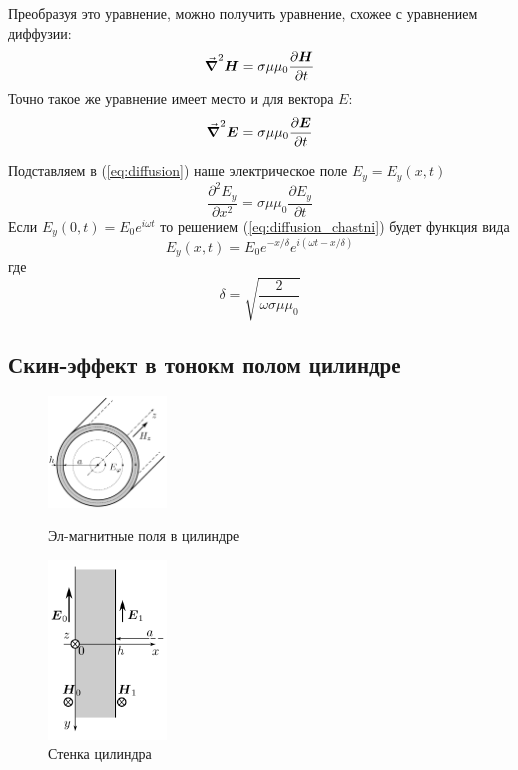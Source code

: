 \documentclass[a4paper, 12pt]{article}
\begin{document}
	Преобразуя это уравнение, можно получить уравнение, схожее с уравнением диффузии:
	\begin{equation}
		\grad^2\vb*{H}=\sigma\mu\mu_0 \frac{\partial \vb*{H}}{\partial t}\label{eq:laplacian_H}
	\end{equation}
	Точно такое же уравнение имеет место и для вектора $E:$
	\begin{equation}
		\grad^2\vb*{E}=\sigma\mu\mu_0 \frac{\partial \vb*{E}}{\partial t}\label{eq:diffusion}
	\end{equation}
	
	Подставляем в (\ref{eq:diffusion}) наше электрическое поле $E_y=E_y(x,t)$
	\begin{equation}
		\frac{\partial^2 E_y}{\partial x^2} = \sigma\mu\mu_0\frac{\partial E_y}{\partial t}
		\label{eq:diffusion_chastni}
	\end{equation}
	Если $E_y(0,t)=E_0 e^{i\omega t}$ то решением (\ref{eq:diffusion_chastni}) будет функция вида
	\begin{equation}
		E_y(x,t)=E_0 e^{-x/\delta} e^{i(\omega t - x/\delta)}
		\label{eq:skin_effect_poluprostranstvo}
	\end{equation}
	где
	\begin{equation}
		\delta = \sqrt{\frac{2}{\omega\sigma\mu\mu_0}}
		\label{eq:delta}
	\end{equation}
	
	\newpage
	\subsection*{Скин-эффект в тонокм полом цилиндре}
	\vspace{1cm}
	\begin{figure}
		\begin{center}
			\includegraphics[width=0.28\textwidth]{cilindr}
		\end{center}
		\caption{Эл-магнитные поля в цилиндре}\label{fig:cilindr}
		
		\begin{center}
			\includegraphics[width=0.28\textwidth]{stenka}
		\end{center}
		\caption{Стенка цилиндра}\label{fig:stenka}
	\end{figure}
	
\end{document}
